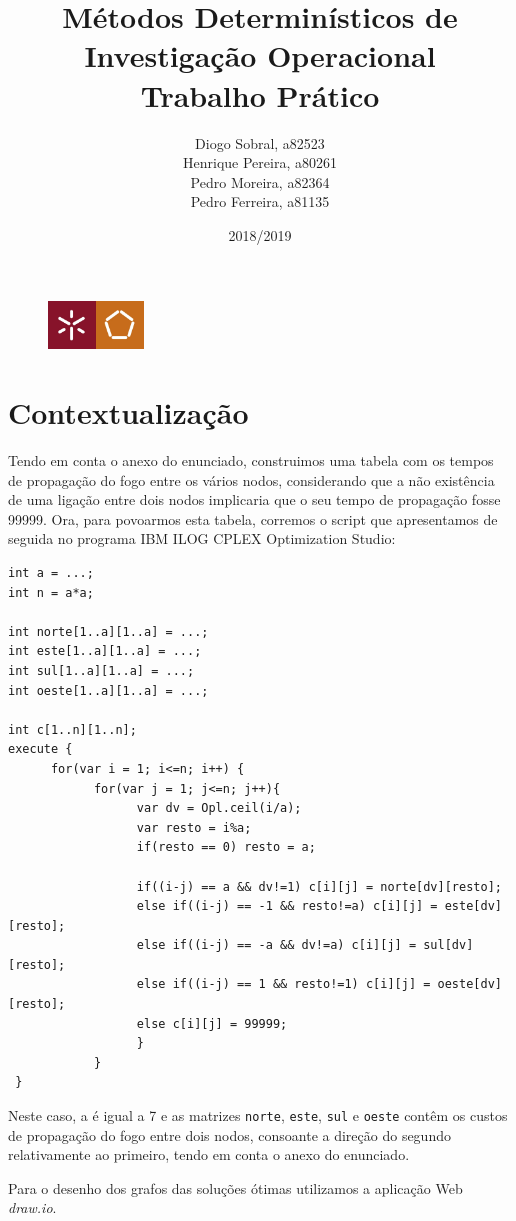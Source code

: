 \documentclass[11pt]{article} %
\title{Métodos Determinísticos de Investigação Operacional \\ \large Trabalho Prático}
\author{Diogo Sobral, a82523 \\ Henrique Pereira, a80261 \\ Pedro Moreira, a82364 \\ Pedro Ferreira, a81135}
\date{2018/2019}
\begin{document}
\maketitle

\begin{figure}[!b]
    \centering
    \includegraphics[width=1in]{um_eeng.jpg}
\end{figure}

\newpage

\section*{Contextualização}
Tendo em conta o anexo do enunciado, construimos uma tabela com os tempos de propagação do fogo entre os vários nodos, considerando que a não existência de uma ligação entre dois nodos implicaria que o seu tempo de propagação fosse 99999. Ora, para povoarmos esta tabela, corremos o script que apresentamos de seguida no programa IBM ILOG CPLEX Optimization Studio:
\begin{verbatim}
int a = ...;
int n = a*a;

int norte[1..a][1..a] = ...;
int este[1..a][1..a] = ...;
int sul[1..a][1..a] = ...;
int oeste[1..a][1..a] = ...;
 
int c[1..n][1..n];
execute {
      for(var i = 1; i<=n; i++) {
            for(var j = 1; j<=n; j++){
                  var dv = Opl.ceil(i/a);
                  var resto = i%a;
                  if(resto == 0) resto = a;

                  if((i-j) == a && dv!=1) c[i][j] = norte[dv][resto];
                  else if((i-j) == -1 && resto!=a) c[i][j] = este[dv][resto];
                  else if((i-j) == -a && dv!=a) c[i][j] = sul[dv][resto];
                  else if((i-j) == 1 && resto!=1) c[i][j] = oeste[dv][resto];
                  else c[i][j] = 99999;
                  }
            }
 }
\end{verbatim}
Neste caso, a é igual a 7 e as matrizes \texttt{norte}, \texttt{este}, \texttt{sul} e \texttt{oeste} contêm os custos de propagação do fogo entre dois nodos, consoante a direção do segundo relativamente ao primeiro, tendo em conta o anexo do enunciado.


Para o desenho dos grafos das soluções ótimas utilizamos a aplicação Web \textit{draw.io}.
\end{document}

